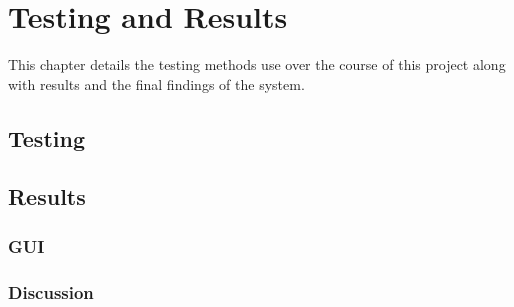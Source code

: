 \chapter{Testing and Results}
\label{cha:results}
This chapter details the testing methods use over the course of this project along with results and the final findings of the system.

\section{Testing}
\section{Results}
\subsection{GUI}
\subsection{Discussion}
